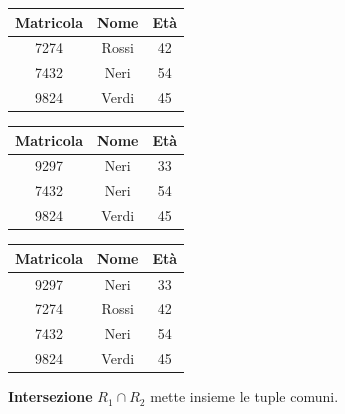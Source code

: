 \documentclass{article}
\begin{document}
\begin{itemize}
{ \begin{minipage}{.2\textwidth}
  \centering
            \begin{tabular}{|c|c|c|}
                 \hline
                 \textbf{Matricola} & \textbf{Nome} & \textbf{Età} \\
                 \hline
                 7274 & Rossi & 42 \\
                 \hline
                 7432 & Neri & 54\\
                 \hline
                 9824 & Verdi & 45 \\
                 \hline
            \end{tabular}
\end{minipage}%
\hfill
\begin{minipage}{.2\textwidth}
  \centering
           \begin{tabular}{|c|c|c|}
                 \hline
                 \textbf{Matricola} & \textbf{Nome} & \textbf{Età} \\
                 \hline
                 9297 & Neri & 33 \\
                 \hline
                 7432 & Neri & 54\\
                 \hline
                 9824 & Verdi & 45 \\
                 \hline
            \end{tabular}
\hspace{1em}
\end{minipage}
\hfill
\begin{minipage}{.3\textwidth}
  \centering
           \begin{tabular}{|c|c|c|}
                 \hline
                 \textbf{Matricola} & \textbf{Nome} & \textbf{Età} \\
                 \hline
                 9297 & Neri & 33 \\
                 \hline
                 7274 & Rossi & 42 \\
                 \hline
                 7432 & Neri & 54\\
                 \hline
                 9824 & Verdi & 45 \\
                 \hline
            \end{tabular}
\hspace{1em}
\end{minipage}

        
        \item \textbf{Intersezione} $R_1 \cap R_2$ mette insieme le tuple comuni. 
        
}
\end{itemize}
\end{document}
